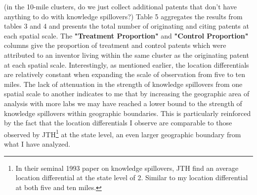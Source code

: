 \documentclass[12pt,letterpaper]{article}
\begin{document}
\begin{table}[H]
\centering
{}
\caption{}
\label{tab:5}
\end{table}
{\color{blue}(in the 10-mile clusters, do we just collect additional patents that don't have anything to do with knowledge spillovers?)}
Table 5 aggregates the results from tables 3 and 4 and presents the total number of originating and citing patents at each spatial scale. The \textbf{"Treatment Proportion"} and \textbf{"Control Proportion"} columns give the proportion of treatment and control patents which were attributed to an inventor living within the same cluster as the originating patent at each spatial scale. 
Interestingly, as mentioned earlier, the location differentials are relatively constant when expanding the scale of observation from five to ten miles. The lack of attenuation in the strength of knowledge spillovers from one spatial scale to another indicates to me that by increasing the geographic area of analysis with more labs we may have reached a lower bound to the strength of knowledge spillovers within geographic boundaries. This is particularly reinforced by the fact that the location differentials I observe are comparable to those observed by JTH\footnote{In their seminal 1993 paper on knowledge spillovers, JTH find an average location differential at the state level of 2. Similar to my location differential at both five and ten miles.} at the state level, an even larger geographic boundary from what I have analyzed.  
\end{document}
